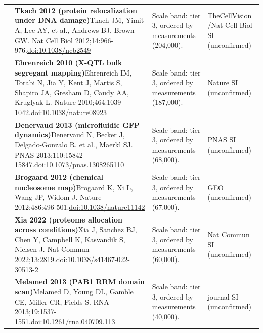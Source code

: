 \begin{landscape}
\begin{longtable}{@{}r@{\hspace{4pt}} L{86mm} L{92mm} L{62mm}@{}}
 & \textbf{Tkach 2012 (protein relocalization under DNA damage)}\newline Tkach JM, Yimit A, Lee AY, et al., Andrews BJ, Brown GW. Nat Cell Biol 2012;14:966-976.\newline \href{https://doi.org/10.1038/ncb2549}{doi:10.1038/\allowbreak ncb2549} & Scale band: tier 3, ordered by measurements (204,000). & TheCellVision /\allowbreak  Nat Cell Biol SI (unconfirmed) \\
 & \textbf{Ehrenreich 2010 (X-QTL bulk segregant mapping)}\newline Ehrenreich IM, Torabi N, Jia Y, Kent J, Martis S, Shapiro JA, Gresham D, Caudy AA, Kruglyak L. Nature 2010;464:1039-1042.\newline \href{https://doi.org/10.1038/nature08923}{doi:10.1038/\allowbreak nature08923} & Scale band: tier 3, ordered by measurements (187,000). & Nature SI (unconfirmed) \\
 & \textbf{Denervaud 2013 (microfluidic GFP dynamics)}\newline Denervaud N, Becker J, Delgado-Gonzalo R, et al., Maerkl SJ. PNAS 2013;110:15842-15847.\newline \href{https://doi.org/10.1073/pnas.1308265110}{doi:10.1073/\allowbreak pnas.1308265110} & Scale band: tier 3, ordered by measurements (68,000). & PNAS SI (unconfirmed) \\
 & \textbf{Brogaard 2012 (chemical nucleosome map)}\newline Brogaard K, Xi L, Wang JP, Widom J. Nature 2012;486:496-501.\newline \href{https://doi.org/10.1038/nature11142}{doi:10.1038/\allowbreak nature11142} & Scale band: tier 3, ordered by measurements (67,000). & GEO (unconfirmed) \\
 & \textbf{Xia 2022 (proteome allocation across conditions)}\newline Xia J, Sanchez BJ, Chen Y, Campbell K, Kasvandik S, Nielsen J. Nat Commun 2022;13:2819.\newline \href{https://doi.org/10.1038/s41467-022-30513-2}{doi:10.1038/\allowbreak s41467-022-30513-2} & Scale band: tier 3, ordered by measurements (60,000). & Nat Commun SI (unconfirmed) \\
 & \textbf{Melamed 2013 (PAB1 RRM domain scan)}\newline Melamed D, Young DL, Gamble CE, Miller CR, Fields S. RNA 2013;19:1537-1551.\newline \href{https://doi.org/10.1261/rna.040709.113}{doi:10.1261/\allowbreak rna.040709.113} & Scale band: tier 3, ordered by measurements (40,000). & journal SI (unconfirmed) \\

\end{longtable}
\end{landscape}
